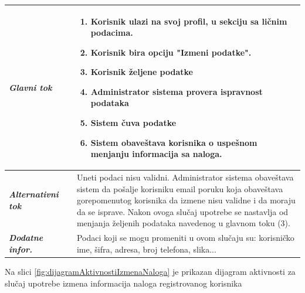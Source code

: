\documentclass[20pt]{article}
\begin{document}
\begin{center}
\begin{longtable}{p{0.23\linewidth} p{0.77\linewidth}}
     {\it \bfseries Glavni tok} &  
     \begin{enumerate}
         \item Korisnik ulazi na svoj profil, u sekciju sa li\v {c}nim podacima.
         \item Korisnik bira opciju "Izmeni podatke".
         \item Korisnik \v {z}eljene podatke
         \item Administrator sistema provera ispravnost podataka
         \item Sistem \v {c}uva podatke
         \item Sistem obave\v {s}tava korisnika o uspe\v {s}nom menjanju informacija sa naloga.
    \end{enumerate}\\
 \hline
 {\it \bfseries Alternativni tok} & Uneti podaci nisu validni. Administrator sistema obave\v {s}tava sistem da po\v {s}alje korisniku email poruku koja obave\v {s}tava gorepomenutog korisnika da izmene nisu validne i da moraju da se isprave. Nakon ovoga slu\v {c}aj upotrebe se nastavlja od menjanja \v {z}eljenih podataka navedenog u glavnom toku (3).\\
 \hline
 {\it \bfseries Dodatne infor.} & Podaci koji se mogu promeniti u ovom slu\v {c}aju su: korisni\v {c}ko ime, \v {s}ifra, adresa, broj telefona, slika...\\
 \hline

\end{longtable}
\end{center}
\newpage
{}
\setlength{\parindent}{1cm}
\fontsize{13}{18} \selectfont 
Na slici \ref{fig:dijagramAktivnostiIzmenaNaloga} je prikazan dijagram aktivnosti za slu\v{c}aj upotrebe izmena informacija naloga registrovanog korisnika
\end{document}
